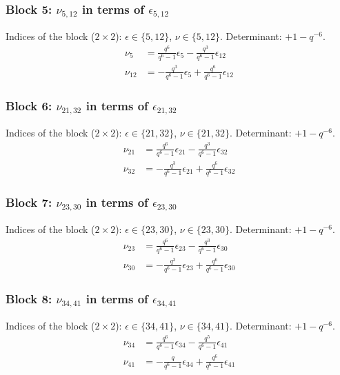 \subsubsection{Block 5: $\nu_{5, 12}$ in terms of $\epsilon_{5, 12}$}
Indices of the block ($2\times 2$): $\epsilon \in \{5, 12\}$, $\nu \in \{5, 12\}$.
Determinant: $+1-q^{-6}$.
\begin{align*}
\nu_{5} &= \frac{q^{6}}{q^{6}-1}\epsilon_{5} - \frac{q^{3}}{q^{6}-1}\epsilon_{12}\\
\nu_{12} &= -\frac{q^{3}}{q^{6}-1}\epsilon_{5} + \frac{q^{6}}{q^{6}-1}\epsilon_{12}
\end{align*}

\subsubsection{Block 6: $\nu_{21, 32}$ in terms of $\epsilon_{21, 32}$}
Indices of the block ($2\times 2$): $\epsilon \in \{21, 32\}$, $\nu \in \{21, 32\}$.
Determinant: $+1-q^{-6}$.
\begin{align*}
\nu_{21} &= \frac{q^{6}}{q^{6}-1}\epsilon_{21} - \frac{q^{3}}{q^{6}-1}\epsilon_{32}\\
\nu_{32} &= -\frac{q^{3}}{q^{6}-1}\epsilon_{21} + \frac{q^{6}}{q^{6}-1}\epsilon_{32}
\end{align*}

\subsubsection{Block 7: $\nu_{23, 30}$ in terms of $\epsilon_{23, 30}$}
Indices of the block ($2\times 2$): $\epsilon \in \{23, 30\}$, $\nu \in \{23, 30\}$.
Determinant: $+1-q^{-6}$.
\begin{align*}
\nu_{23} &= \frac{q^{6}}{q^{6}-1}\epsilon_{23} - \frac{q^{3}}{q^{6}-1}\epsilon_{30}\\
\nu_{30} &= -\frac{q^{3}}{q^{6}-1}\epsilon_{23} + \frac{q^{6}}{q^{6}-1}\epsilon_{30}
\end{align*}

\subsubsection{Block 8: $\nu_{34, 41}$ in terms of $\epsilon_{34, 41}$}
Indices of the block ($2\times 2$): $\epsilon \in \{34, 41\}$, $\nu \in \{34, 41\}$.
Determinant: $+1-q^{-6}$.
\begin{align*}
\nu_{34} &= \frac{q^{6}}{q^{6}-1}\epsilon_{34} - \frac{q^{5}}{q^{6}-1}\epsilon_{41}\\
\nu_{41} &= -\frac{q}{q^{6}-1}\epsilon_{34} + \frac{q^{6}}{q^{6}-1}\epsilon_{41}
\end{align*}

